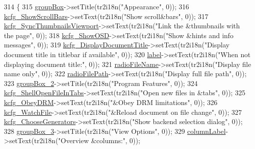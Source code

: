 \begin{DoxyCode}
314     \{
315         \hyperlink{classUi__DlgGeneralBase_aa25408255cc1bc3b6d720b58ceb42e32}{groupBox}->setTitle(tr2i18n(\textcolor{stringliteral}{"Appearance"}, 0));
316         \hyperlink{classUi__DlgGeneralBase_a58a8f3825a9f66542cd2e6e7e6e66ee9}{kcfg\_ShowScrollBars}->setText(tr2i18n(\textcolor{stringliteral}{"Show scroll&bars"}, 0));
317         \hyperlink{classUi__DlgGeneralBase_a3bd89dac60042cf193e8f294f8d255b1}{kcfg\_SyncThumbnailsViewport}->setText(tr2i18n(\textcolor{stringliteral}{"Link the &thumbnails with
       the page"}, 0));
318         \hyperlink{classUi__DlgGeneralBase_a15d077fb29bfbb39a64bf54cccb9a0d3}{kcfg\_ShowOSD}->setText(tr2i18n(\textcolor{stringliteral}{"Show &hints and info messages"}, 0));
319         \hyperlink{classUi__DlgGeneralBase_a0283039d02817b23b8f52f3b670bd9a8}{kcfg\_DisplayDocumentTitle}->setText(tr2i18n(\textcolor{stringliteral}{"Display document title in
       titlebar if available"}, 0));
320         \hyperlink{classUi__DlgGeneralBase_a6580c8bff94e006f767780163d3ca0da}{label}->setText(tr2i18n(\textcolor{stringliteral}{"When not displaying document title:"}, 0));
321         \hyperlink{classUi__DlgGeneralBase_a40cff822b48d52cb4524aa842477519a}{radioFileName}->setText(tr2i18n(\textcolor{stringliteral}{"Display file name only"}, 0));
322         \hyperlink{classUi__DlgGeneralBase_ac39d9951537fef09370ebbbf6bf52d44}{radioFilePath}->setText(tr2i18n(\textcolor{stringliteral}{"Display full file path"}, 0));
323         \hyperlink{classUi__DlgGeneralBase_ae822e688fc0f616b4a29511bc5615a3d}{groupBox\_2}->setTitle(tr2i18n(\textcolor{stringliteral}{"Program Features"}, 0));
324         \hyperlink{classUi__DlgGeneralBase_abb932ae5a296f99d600ae0bd76423797}{kcfg\_ShellOpenFileInTabs}->setText(tr2i18n(\textcolor{stringliteral}{"Open new files in &tabs"}, 0));
325         \hyperlink{classUi__DlgGeneralBase_ae06aa2913c5352f7291531fa8709216f}{kcfg\_ObeyDRM}->setText(tr2i18n(\textcolor{stringliteral}{"&Obey DRM limitations"}, 0));
326         \hyperlink{classUi__DlgGeneralBase_ad78f563114498d2bcc4350d8939ad2ec}{kcfg\_WatchFile}->setText(tr2i18n(\textcolor{stringliteral}{"&Reload document on file change"}, 0));
327         \hyperlink{classUi__DlgGeneralBase_ad63d50a9664ae9d855e43ac1a95e3629}{kcfg\_ChooseGenerators}->setText(tr2i18n(\textcolor{stringliteral}{"Show backend selection dialog"}, 0));
328         \hyperlink{classUi__DlgGeneralBase_a14484da34e83830a42cd4929ba2c7d86}{groupBox\_3}->setTitle(tr2i18n(\textcolor{stringliteral}{"View Options"}, 0));
329         \hyperlink{classUi__DlgGeneralBase_ad6a70134bad0df0f344b5ec449ad9995}{columnLabel}->setText(tr2i18n(\textcolor{stringliteral}{"Overview &columns:"}, 0));

\end{DoxyCode}
